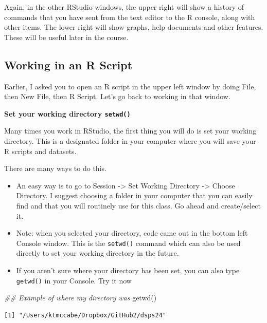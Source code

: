 \documentclass[
  letterpaper,
  DIV=11,
  numbers=noendperiod]{scrreprt}
\newenvironment{Shaded}{\begin{snugshade}}{\end{snugshade}}
\newcommand{\DocumentationTok}[1]{\textcolor[rgb]{0.37,0.37,0.37}{\textit{#1}}}
\newcommand{\FunctionTok}[1]{\textcolor[rgb]{0.28,0.35,0.67}{#1}}
\newcommand{\NormalTok}[1]{\textcolor[rgb]{0.00,0.23,0.31}{#1}}
\providecommand{\tightlist}{%
  \setlength{\itemsep}{0pt}\setlength{\parskip}{0pt}}\usepackage{longtable,booktabs,array}
\begin{document}
Again, in the other RStudio windows, the upper right will show a history
of commands that you have sent from the text editor to the R console,
along with other items. The lower right will show graphs, help documents
and other features. These will be useful later in the course.

\hypertarget{working-in-an-r-script}{%
\subsection{Working in an R Script}\label{working-in-an-r-script}}

Earlier, I asked you to open an R script in the upper left window by
doing File, then New File, then R Script. Let's go back to working in
that window.

\textbf{Set your working directory \texttt{setwd()}}

Many times you work in RStudio, the first thing you will do is set your
working directory. This is a designated folder in your computer where
you will save your R scripts and datasets.

There are many ways to do this.

\begin{itemize}
\tightlist
\item
  An easy way is to go to Session -\textgreater{} Set Working Directory
  -\textgreater{} Choose Directory. I suggest choosing a folder in your
  computer that you can easily find and that you will routinely use for
  this class. Go ahead and create/select it.
\item
  Note: when you selected your directory, code came out in the bottom
  left Console window. This is the \texttt{setwd()} command which can
  also be used directly to set your working directory in the future.
\item
  If you aren't sure where your directory has been set, you can also
  type \texttt{getwd()} in your Console. Try it now
\end{itemize}

\begin{Shaded}
\begin{Highlighting}[]
\DocumentationTok{\#\# Example of where my directory was}
\FunctionTok{getwd}\NormalTok{()}
\end{Highlighting}
\end{Shaded}

\begin{verbatim}
[1] "/Users/ktmccabe/Dropbox/GitHub2/dsps24"
\end{verbatim}
\end{document}
